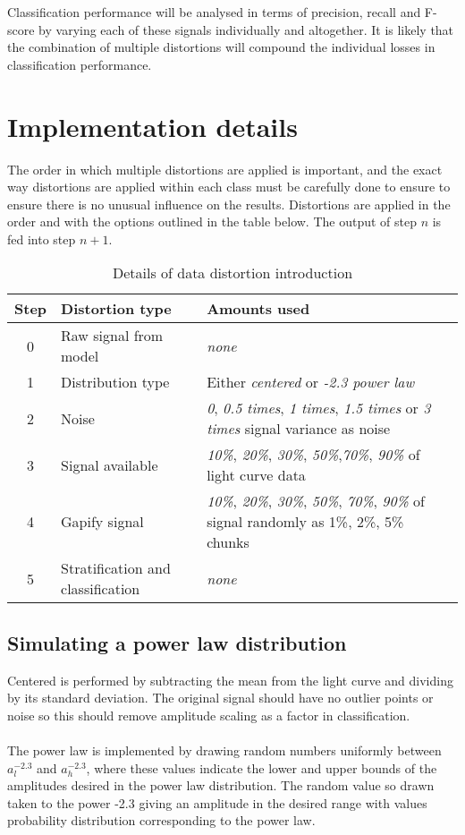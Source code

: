 		Classification performance will be analysed in terms of precision, recall and F-score by varying each of these signals individually and altogether. It is likely that the combination of multiple distortions will compound the individual losses in classification performance.
		
		
		
	\section{Implementation details}
		The order in which multiple distortions are applied is important, and the exact way distortions are applied within each class must be carefully done to ensure to ensure there is no unusual influence on the results. Distortions are applied in the order and with the options outlined in the table below. The output of step $n$ is fed into step $n + 1$.
		
		\begin{table}[ht!]
		\centering
		\begin{tabular}{|c|l|l|} \hline
			\textbf{Step} &\textbf{Distortion type} & \textbf{Amounts used} \\ \hline
			0 & Raw signal from model & \emph{none} \\
			1 & Distribution type & Either \emph{centered} or \emph{-2.3 power law} \\
			2 & Noise & \emph{0}, \emph{0.5 times}, \emph{1 times}, \emph{1.5 times} or \emph{3 times} signal variance as noise\\
			3 & Signal available & \emph{10\%}, \emph{20\%}, \emph{30\%}, \emph{50\%},\emph{70\%}, \emph{90\%} of light curve data \\
			4 & Gapify signal & \emph{10\%}, \emph{20\%}, \emph{30\%}, \emph{50\%}, \emph{70\%}, \emph{90\%} of signal randomly as 1\%, 2\%, 5\% chunks \\
			5 & Stratification and classification & \emph{none} \\ \hline
		\end{tabular}
		\caption{Details of data distortion introduction}
		\end{table}
		
		\subsection{Simulating a power law distribution}
		Centered is performed by subtracting the mean from the light curve and dividing by its standard deviation. The original signal should have no outlier points or noise so this should remove amplitude scaling as a factor in classification. \\ \\
		The power law is implemented by drawing random numbers uniformly between $a_{l}^{-2.3}$ and $a_{h}^{-2.3}$, where these values indicate the lower and upper bounds of the amplitudes desired in the power law distribution. The random value so drawn taken to the power -2.3 giving an amplitude in the desired range with values probability distribution corresponding to the power law. %
		
